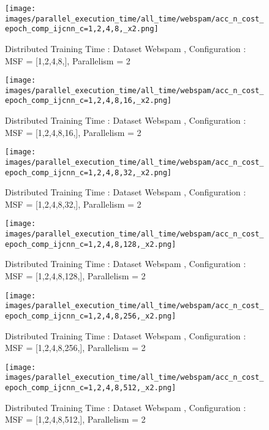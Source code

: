 \begin{figure*}[htbp]
\centering
\texttt{[image: images/parallel\_execution\_time/all\_time/webspam/acc\_n\_cost\_epoch\_comp\_ijcnn\_c=1,2,4,8,\_x2.png]}
\caption{Distributed Training Time : Dataset Webspam , Configuration : MSF = [1,2,4,8,], Parallelism = 2}
\label{fig:dis-msf-tr-time-webspam-x2}
\end{figure*}


\begin{figure*}[htbp]
\centering
\texttt{[image: images/parallel\_execution\_time/all\_time/webspam/acc\_n\_cost\_epoch\_comp\_ijcnn\_c=1,2,4,8,16,\_x2.png]}
\caption{Distributed Training Time : Dataset Webspam , Configuration : MSF = [1,2,4,8,16,], Parallelism = 2}
\label{fig:dis-msf-tr-time-webspam-x2}
\end{figure*}


\begin{figure*}[htbp]
\centering
\texttt{[image: images/parallel\_execution\_time/all\_time/webspam/acc\_n\_cost\_epoch\_comp\_ijcnn\_c=1,2,4,8,32,\_x2.png]}
\caption{Distributed Training Time : Dataset Webspam , Configuration : MSF = [1,2,4,8,32,], Parallelism = 2}
\label{fig:dis-msf-tr-time-webspam-x2}
\end{figure*}


\begin{figure*}[htbp]
\centering
\texttt{[image: images/parallel\_execution\_time/all\_time/webspam/acc\_n\_cost\_epoch\_comp\_ijcnn\_c=1,2,4,8,128,\_x2.png]}
\caption{Distributed Training Time : Dataset Webspam , Configuration : MSF = [1,2,4,8,128,], Parallelism = 2}
\label{fig:dis-msf-tr-time-webspam-x2}
\end{figure*}


\begin{figure*}[htbp]
\centering
\texttt{[image: images/parallel\_execution\_time/all\_time/webspam/acc\_n\_cost\_epoch\_comp\_ijcnn\_c=1,2,4,8,256,\_x2.png]}
\caption{Distributed Training Time : Dataset Webspam , Configuration : MSF = [1,2,4,8,256,], Parallelism = 2}
\label{fig:dis-msf-tr-time-webspam-x2}
\end{figure*}


\begin{figure*}[htbp]
\centering
\texttt{[image: images/parallel\_execution\_time/all\_time/webspam/acc\_n\_cost\_epoch\_comp\_ijcnn\_c=1,2,4,8,512,\_x2.png]}
\caption{Distributed Training Time : Dataset Webspam , Configuration : MSF = [1,2,4,8,512,], Parallelism = 2}
\label{fig:dis-msf-tr-time-webspam-x2}
\end{figure*}


